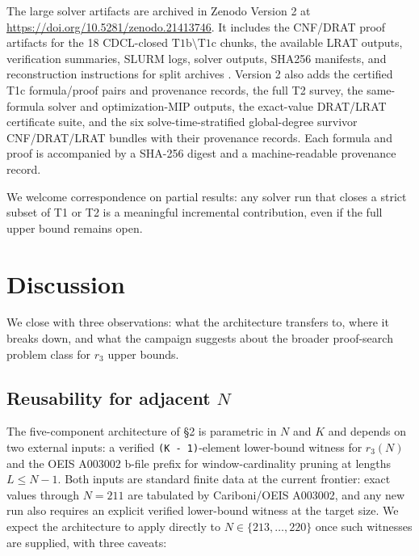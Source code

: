 The large solver artifacts are archived in Zenodo Version 2 at
\url{https://doi.org/10.5281/zenodo.21413746}. It includes the
CNF/DRAT proof artifacts for the 18 CDCL-closed
$\mathrm{T1b}\setminus\mathrm{T1c}$ chunks, the available LRAT outputs,
verification summaries, SLURM logs, solver outputs, SHA256 manifests, and
reconstruction instructions for split archives
\cite{ergezer-r3-212-artifacts-2026}. Version 2 also adds the
certified T1c formula/proof pairs and provenance records, the full T2 survey,
the same-formula solver and optimization-MIP outputs, the exact-value DRAT/LRAT
certificate suite, and the six solve-time-stratified global-degree survivor
CNF/DRAT/LRAT bundles with their provenance records. Each formula and proof is accompanied by a SHA-256 digest
and a machine-readable provenance record.

We welcome correspondence on partial results: any solver run that
closes a strict subset of T1 or T2 is a meaningful incremental
contribution, even if the full upper bound remains open.

\section{Discussion}\label{discussion}

We close with three observations: what the architecture transfers to,
where it breaks down, and what the campaign suggests about the
broader proof-search problem class for $r_3$ upper bounds.

\subsection{\texorpdfstring{Reusability for adjacent $N$}{Reusability for adjacent N}}\label{reusability-for-adjacent-n}

The five-component architecture of §2 is parametric in $N$ and $K$
and depends on two external inputs: a verified \texttt{(K\ -\ 1)}-element
lower-bound witness for $r_3(N)$ and the OEIS A003002 b-file prefix
for window-cardinality pruning at lengths $L\leq N-1$. Both inputs
are standard finite data at the current frontier: exact values through
$N = 211$ are tabulated by Cariboni/OEIS A003002, and any new run also
requires an explicit verified lower-bound witness at the target size.
We expect the architecture to apply directly to
$N\in\{213,\ldots,220\}$ once such witnesses are supplied, with three caveats:

